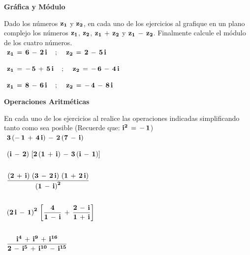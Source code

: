 \documentclass[a4paper,11pt,openany]{book}
\begin{document}
\newpage


\begin{center}
\textbf{Gráfica y Módulo}
\end{center}

Dado los números $\bf{z_{1}}$ y $\bf{z_{2}}$, en cada uno de los ejercicios  al  grafique en un plano complejo los números $\bf{z_{1}}$, $\bf{z_{2}}$, $\bf{z_{1}\,+\,z_{2}}$ y $\bf{z_{1}\,-\,z_{2}}$. Finalmente calcule el módulo de los cuatro números.\\

\textcolor{ao(english)}{}\,\quad\,$\bf{z_{1}\,=\,6\,-\,2\,i \quad\,;\,\quad z_{2}\,=\,2\,-\,5\,i}$

\textcolor{ao(english)}{}\,\quad\,$\bf{z_{1}\,=\,-\,5\,+\,5\,i \quad\,;\,\quad z_{2}\,=\,-\,6\,-\,4\,i}$

\textcolor{ao(english)}{}\,\quad\,$\bf{z_{1}\,=\,8\,-\,6\,i \quad\,;\,\quad z_{2}\,=\,-\,4\,-\,8\,i}$

\begin{center}
\textbf{Operaciones Aritméticas}
\end{center}

En cada uno de los ejercicios  al  realice las operaciones indicadas simplificando tanto como sea posible (Recuerde que: $\bf{i^{2}\,=\,-\,1}$)\\

\textcolor{ao(english)}{}\,\quad\,$\bf{3\left(-\,1\,+\,4\,i\right)\,-\,2\left(7\,-\,i\right)}$

\textcolor{ao(english)}{}\,\quad\,$\bf{\left(i\,-\,2\right)\,\left[2\left(1\,+\,i\right)\,-\,3\left(i\,-\,1\right)\right]}$

$$$$

\textcolor{ao(english)}{}\,\quad\,$\bf{\dfrac{\left(2\,+\,i\right)\,\left(3\,-\,2\,i\right)\,\left(1\,+\,2\,i\right)}{\left(1\,-\,i\right)^{2}}}$

$$$$

\textcolor{ao(english)}{}\,\quad\,$\bf{\left(2\,i\,-\,1\right)^{2}\,\left[\dfrac{4}{1\,-\,i}\,+\,\dfrac{2\,-\,i}{1\,+\,i}\right]}$

$$$$

\textcolor{ao(english)}{}\,\quad\,$\bf{\dfrac{i^{4}\,+\,i^{9}\,+\,i^{16}}{2\,-\,i^{5}\,+\,i^{10}\,-\,i^{15}}}$
\end{document}
